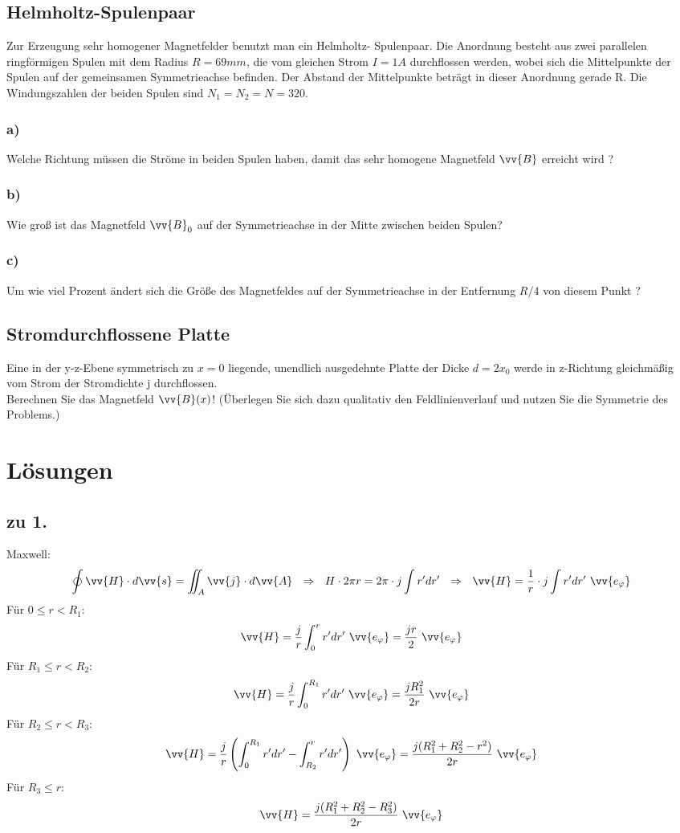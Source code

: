\documentclass[a4paper,12pt]{article}
\begin{document}
\subsection{Helmholtz-Spulenpaar}
Zur  Erzeugung  sehr  homogener  Magnetfelder  benutzt  man  ein  Helmholtz- 
Spulenpaar. Die Anordnung besteht aus zwei parallelen ringförmigen Spulen mit 
dem Radius $R = 69 mm$, die vom gleichen Strom $I = 1 A$ durchflossen werden, 
wobei  sich  die  Mittelpunkte  der  Spulen  auf  der  gemeinsamen  Symmetrieachse 
befinden.  Der  Abstand  der  Mittelpunkte  beträgt  in  dieser  Anordnung  gerade  R. 
Die Windungszahlen der beiden Spulen sind $N_1  = N_2  = N = 320$.
\subsubsection*{a)}
Welche  Richtung  müssen  die  Ströme  in  beiden  Spulen  haben,  damit 
  das sehr homogene Magnetfeld $\vv{B}$ erreicht wird ?
\subsubsection*{b)}
Wie groß ist das Magnetfeld $\vv{B}_0$ auf der Symmetrieachse in der Mitte zwischen beiden Spulen? 
\subsubsection*{c)}
Um  wie  viel  Prozent  ändert  sich  die  Größe  des  Magnetfeldes  auf  der 
  Symmetrieachse in der Entfernung $R/4$ von diesem Punkt ?
\subsection{Stromdurchflossene Platte}
Eine  in  der  y-z-Ebene  symmetrisch  zu  $x  =  0$  liegende,  unendlich  ausgedehnte 
Platte  der  Dicke  $d  =  2x_0$   werde  in  z-Richtung  gleichmäßig  vom  Strom  der 
Stromdichte j durchflossen.\\ 
  Berechnen  Sie  das  Magnetfeld $\vv{B}(x)$!  (Überlegen  Sie  sich  dazu  qualitativ  den 
Feldlinienverlauf und nutzen Sie die Symmetrie des Problems.) 

\section{Lösungen}
\subsection*{zu 1.} Maxwell: $$\oint\vv{H}\cdot d\vv{s}=\iint_A \vv{j}\cdot d\vv{A}\ \ \Rightarrow\ \ H\cdot 2\pi r = 2\pi\cdot j\int r'dr' \ \ \Rightarrow\ \ \vv{H}=\frac {1}{r}\cdot j\int r'dr'\ \vv{e_{\varphi}}$$
Für $0\le r< R_1$: $$\vv{H}=\frac{j}{r}\int_0^r r'dr'\ \vv{e_{\varphi}} = \frac{jr}{2}\ \vv{e_{\varphi}}$$
Für $R_1\le r <R_2$: $$\vv{H}=\frac{j}{r}\int_0^{R_1} r'dr'\ \vv{e_{\varphi}}=\frac{jR_1^2}{2r}\ \vv{e_{\varphi}}$$
Für $R_2\le r<R_3$: $$\vv{H}=\frac{j}{r}\left(\int_0^{R_1}r'dr'-\int_{R_2}^{r} r'dr'\right)\ \vv{e_{\varphi}}=\frac{j(R_1^2+R_2^2-r^2)}{2r}\ \vv{e_{\varphi}}$$
Für $R_3\le r$: $$\vv{H}=\frac{j(R_1^2+R_2^2-R_3^2)}{2r}\ \vv{e_{\varphi}}$$
\end{document}
